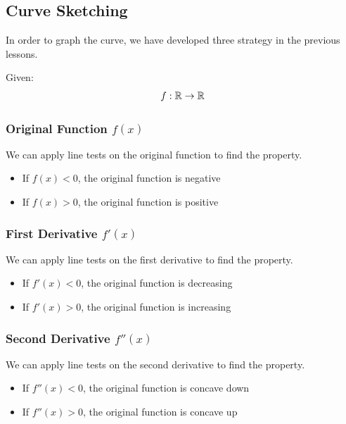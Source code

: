\subsection{Curve Sketching}
In order to graph the curve, we have developed three strategy in the previous lessons. 

Given:
\begin{align*}
    f: \mathbb{R} \to \mathbb{R}
\end{align*}

\subsubsection{Original Function $f(x)$}
We can apply line tests on the original function to find the property. 
\begin{itemize}
    \item If $f(x) < 0$, the original function is negative
    \item If $f(x) > 0$, the original function is positive 
\end{itemize}

\subsubsection{First Derivative $f'(x)$}
We can apply line tests on the first derivative to find the property. 
\begin{itemize}
    \item If $f'(x) < 0$, the original function is decreasing
    \item If $f'(x) > 0$, the original function is increasing
\end{itemize}

\subsubsection{Second Derivative $f''(x)$}
We can apply line tests on the second derivative to find the property. 
\begin{itemize}
    \item If $f''(x) < 0$, the original function is concave down
    \item If $f''(x) > 0$, the original function is concave up 
\end{itemize}